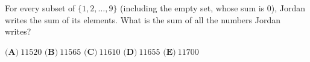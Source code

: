 For every subset of $\{1,2,\dots,9\}$ (including the empty set, whose sum is $0$), Jordan writes the sum of its elements. What is the sum of all the numbers Jordan writes?

$\textbf{(A)}\ $$11520$ \qquad $\textbf{(B)}\ $$11565$ \qquad $\textbf{(C)}\ $$11610$ \qquad $\textbf{(D)}\ $$11655$ \qquad $\textbf{(E)}\ $$11700$
